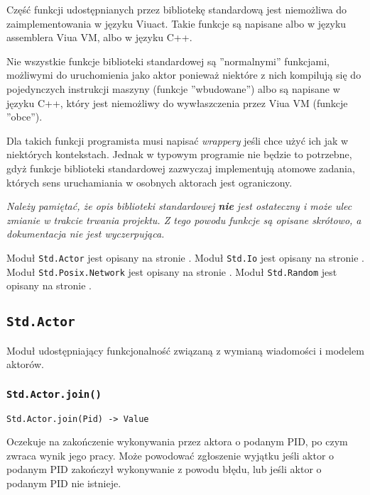 Część funkcji udostępnianych przez bibliotekę standardową jest niemożliwa do zaimplementowania w języku
Viuact. Takie funkcje są napisane albo w języku assemblera Viua VM, albo w języku C++.

Nie wszystkie funkcje biblioteki standardowej są ''normalnymi'' funkcjami, możliwymi do uruchomienia jako
aktor ponieważ niektóre z nich kompilują się do pojedynczych instrukcji maszyny (funkcje ''wbudowane'') albo
są napisane w języku C++, który jest niemożliwy do wywłaszczenia przez Viua VM (funkcje ''obce'').

Dla takich funkcji programista musi napisać \emph{wrappery} jeśli chce użyć ich jak w niektórych kontekstach.
Jednak w typowym programie nie będzie to potrzebne, gdyż funkcje biblioteki standardowej zazwyczaj
implementują atomowe zadania, których sens uruchamiania w osobnych aktorach jest ograniczony.

\begin{center}
\emph{Należy pamiętać, że opis biblioteki standardowej \textbf{nie} jest ostateczny i może ulec zmianie w
trakcie trwania projektu. Z tego powodu funkcje są opisane skrótowo, a dokumentacja nie jest wyczerpująca.}
\end{center}

Moduł \texttt{Std.Actor} jest opisany na stronie \pageref{stdlib_Std_Actor}.
Moduł \texttt{Std.Io} jest opisany na stronie \pageref{stdlib_Std_Io}.
Moduł \texttt{Std.Posix.Network} jest opisany na stronie \pageref{stdlib_Std_Posix_Network}.
Moduł \texttt{Std.Random} jest opisany na stronie \pageref{stdlib_Std_Random}.

\subsection{\texttt{Std.Actor}}
\label{stdlib_Std_Actor}

Moduł udostępniający funkcjonalność związaną z wymianą wiadomości i modelem aktorów.

\subsubsection{\texttt{Std.Actor.join()}}
\label{Std_Actor_join}

\begin{small}
\begin{lstlisting}
Std.Actor.join(Pid) -> Value
\end{lstlisting}
\end{small}

Oczekuje na zakończenie wykonywania przez aktora o podanym PID, po czym zwraca wynik jego pracy.
Może powodować zgłoszenie wyjątku jeśli aktor o podanym PID zakończył wykonywanie z powodu błędu, lub jeśli aktor
o podanym PID nie istnieje.

